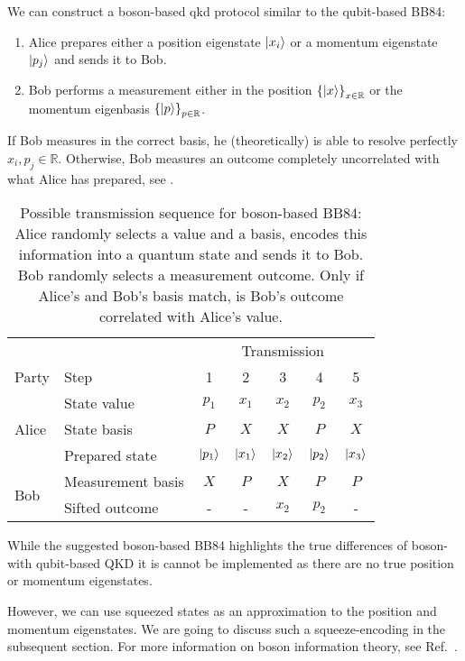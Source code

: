 We can construct a boson-based \gls{qkd} protocol similar to the qubit-based BB84:
\begin{enumerate}
	\item Alice prepares either a position eigenstate $\ket{x_i}$ or a momentum eigenstate $\ket{p_j}$ and sends it to Bob.
	\item Bob performs a measurement either in the position $\left\{\ket{x}\right\}_{x\in\mathbb{R}}$ or the momentum eigenbasis $\left\{\ket{p}\right\}_{p\in\mathbb{R}}$.
\end{enumerate}
If Bob measures in the correct basis, he (theoretically) is able to resolve perfectly $x_i,p_j\in\mathbb{R}$.
Otherwise, Bob measures an outcome completely uncorrelated with what Alice has prepared, see .
\begin{table}[htb]
	\centering
	\begin{tabular}{llccccc}
		\toprule
		& & \multicolumn{5}{c}{Transmission} \\
		\cmidrule{3-7}
		Party & Step & 1 & 2 & 3 & 4 & 5 \\ 
		\midrule
		\multirow{3}{*}{Alice} & State value & $p_1$ & $x_1$ & $x_2$ & $p_2$ & $x_3$ \\
		& State basis & $P$ & $X$ & $X$ & $P$ & $X$ \\
		& Prepared state & $\ket{p_1}$ & $\ket{x_1}$ & $\ket{x_2}$ & $\ket{p_2}$ & $\ket{x_3}$ \\
		\cmidrule{1-1}
		\multirow{2}{*}{Bob} & Measurement basis & $X$ & $P$ & $X$ & $P$ & $P$ \\
		& Sifted outcome & - & - & $x_2$ & $p_2$ & - \\
		\bottomrule
	\end{tabular}
	\caption{Possible transmission sequence for boson-based BB84: Alice randomly selects a value and a basis, encodes this information into a quantum state and sends it to Bob. Bob randomly selects a measurement outcome. Only if Alice's and Bob's basis match, is Bob's outcome correlated with Alice's value.}\label{tab:boson_transmission_sequence}
\end{table}
While the suggested boson-based BB84 highlights the true differences of boson- with qubit-based QKD it is cannot be implemented as there are no true position or momentum eigenstates.

However, we can use squeezed states as an approximation to the position and momentum eigenstates.
We are going to discuss such a squeeze-encoding in the subsequent section.
For more information on boson information theory, see Ref.~\cite{Weedbrook2012,Ferraro2005}.

